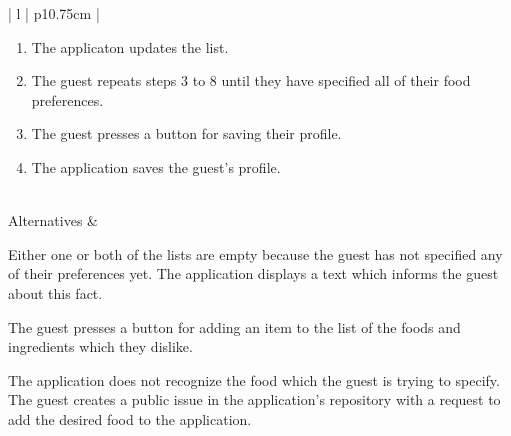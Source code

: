 \begin{center}
\begin{tabular}{| l | p{10.75cm} | }
\begin{minipage}[t]{\linewidth}
\begin{enumerate}[leftmargin=*,nosep,before=\vspace{-0.575\baselineskip},after=\strut]
        \item The applicaton updates the list.
        \item The guest repeats steps 3 to 8 until they have specified all of their food preferences.
        \item The guest presses a button for saving their profile.
        \item The application saves the guest's profile. 
      \end{enumerate}
    \end{minipage}
    \\
    \hline
    Alternatives &
    \begin{minipage}[t]{\linewidth}
      \begin{description}[nosep,after=\strut]
        \item [A1:] Either one or both of the lists are empty because the guest has not specified any of their preferences yet. The application displays a text which informs the guest about this fact.
        \item [A2:] The guest presses a button for adding an item to the list of the foods and ingredients which they dislike.
        \item [A3:] The application does not recognize the food which the guest is trying to specify. The guest creates a public issue in the application's repository with a request to add the desired food to the application.
      \end{description}
    \end{minipage}
    \\
    \hline
  \end{tabular}
  \newline
\end{center}

\newpage

